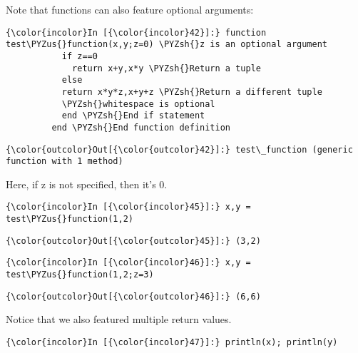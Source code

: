 \documentclass[11pt]{article}
\def\PYZus{\char`\_}
\def\PYZsh{\char`\#}
\begin{document}
Note that functions can also feature optional arguments:

    \begin{Verbatim}[commandchars=\\\{\}]
{\color{incolor}In [{\color{incolor}42}]:} function test\PYZus{}function(x,y;z=0) \PYZsh{}z is an optional argument
           if z==0
             return x+y,x*y \PYZsh{}Return a tuple
           else
           return x*y*z,x+y+z \PYZsh{}Return a different tuple
           \PYZsh{}whitespace is optional
           end \PYZsh{}End if statement
         end \PYZsh{}End function definition
\end{Verbatim}

            \begin{Verbatim}[commandchars=\\\{\}]
{\color{outcolor}Out[{\color{outcolor}42}]:} test\_function (generic function with 1 method)
\end{Verbatim}
        
    Here, if z is not specified, then it's 0.

    \begin{Verbatim}[commandchars=\\\{\}]
{\color{incolor}In [{\color{incolor}45}]:} x,y = test\PYZus{}function(1,2)
\end{Verbatim}

            \begin{Verbatim}[commandchars=\\\{\}]
{\color{outcolor}Out[{\color{outcolor}45}]:} (3,2)
\end{Verbatim}
        
    \begin{Verbatim}[commandchars=\\\{\}]
{\color{incolor}In [{\color{incolor}46}]:} x,y = test\PYZus{}function(1,2;z=3)
\end{Verbatim}

            \begin{Verbatim}[commandchars=\\\{\}]
{\color{outcolor}Out[{\color{outcolor}46}]:} (6,6)
\end{Verbatim}
        
    Notice that we also featured multiple return values.

    \begin{Verbatim}[commandchars=\\\{\}]
{\color{incolor}In [{\color{incolor}47}]:} println(x); println(y)
\end{Verbatim}
\end{document}
